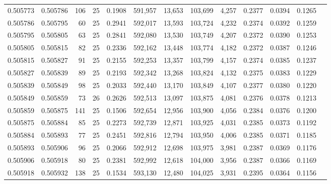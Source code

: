 \begin{tabular}{rrrrrrrrrrrrr}
0.505773 & 0.505786 & 106 &  25 &                                     0.1908 & 591,957 &  13,653 & 103,699 &   4,257 & 0.2377 & 0.0394 & 0.1265 \\
0.505786 & 0.505795 &  60 &  25 &                                     0.2941 & 592,017 &  13,593 & 103,724 &   4,232 & 0.2374 & 0.0392 & 0.1259 \\
0.505795 & 0.505805 &  63 &  25 &                                     0.2841 & 592,080 &  13,530 & 103,749 &   4,207 & 0.2372 & 0.0390 & 0.1253 \\
0.505805 & 0.505815 &  82 &  25 &                                     0.2336 & 592,162 &  13,448 & 103,774 &   4,182 & 0.2372 & 0.0387 & 0.1246 \\
0.505815 & 0.505827 &  91 &  25 &                                     0.2155 & 592,253 &  13,357 & 103,799 &   4,157 & 0.2374 & 0.0385 & 0.1237 \\
0.505827 & 0.505839 &  89 &  25 &                                     0.2193 & 592,342 &  13,268 & 103,824 &   4,132 & 0.2375 & 0.0383 & 0.1229 \\
0.505839 & 0.505849 &  98 &  25 &                                     0.2033 & 592,440 &  13,170 & 103,849 &   4,107 & 0.2377 & 0.0380 & 0.1220 \\
0.505849 & 0.505859 &  73 &  26 &                                     0.2626 & 592,513 &  13,097 & 103,875 &   4,081 & 0.2376 & 0.0378 & 0.1213 \\
0.505859 & 0.505875 & 141 &  25 &                                     0.1506 & 592,654 &  12,956 & 103,900 &   4,056 & 0.2384 & 0.0376 & 0.1200 \\
0.505875 & 0.505884 &  85 &  25 &                                     0.2273 & 592,739 &  12,871 & 103,925 &   4,031 & 0.2385 & 0.0373 & 0.1192 \\
0.505884 & 0.505893 &  77 &  25 &                                     0.2451 & 592,816 &  12,794 & 103,950 &   4,006 & 0.2385 & 0.0371 & 0.1185 \\
0.505893 & 0.505906 &  96 &  25 &                                     0.2066 & 592,912 &  12,698 & 103,975 &   3,981 & 0.2387 & 0.0369 & 0.1176 \\
0.505906 & 0.505918 &  80 &  25 &                                     0.2381 & 592,992 &  12,618 & 104,000 &   3,956 & 0.2387 & 0.0366 & 0.1169 \\
0.505918 & 0.505932 & 138 &  25 &                                     0.1534 & 593,130 &  12,480 & 104,025 &   3,931 & 0.2395 & 0.0364 & 0.1156 \\

\end{tabular}
